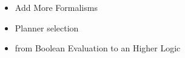 \documentclass[pdftex,12pt,a4paper]{report}
\begin{document}
\begin{itemize}
\item Add More Formalisms
\item Planner selection
\item from Boolean Evaluation to an Higher Logic
\end{itemize}
%
%
%
%
%
%
%
%
%
\end{document}
